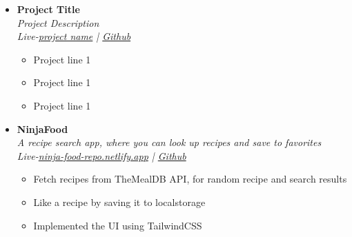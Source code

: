 \documentclass[11pt, oneside, a4paper, titlepage]{article}
\begin{document}
\begin{tcolorbox}
\begin{minipage}[t]{11cm}
\begin{tcolorbox}[grow to right by=0.75cm,colframe=white,colback=white]
\begin{itemize}
        \item
        {
          \textbf{Project Title} \\
          \textit{Project Description} \\
          \textit{Live-\href{url}{project name} | \href{https://github.com/SazedWorldbringer}{Github}} \\
          \vspace*{-0.7cm}
          \begin{itemize}
            \item Project line 1
            \item Project line 1
            \item Project line 1
          \end{itemize}
        }

        \item
        {
          \textbf{NinjaFood} \\
          \textit{A recipe search app, where you can look up recipes and save to favorites} \\
          \textit{Live-\href{https://ninja-food-repo.netlify.app}{ninja-food-repo.netlify.app} | \href{https://github.com/SazedWorldbringer/ninjafood}{Github}} \\
          \vspace*{-0.7cm}
          \begin{itemize}
            \item Fetch recipes from TheMealDB API, for random recipe and search results
            \item Like a recipe by saving it to localstorage
            \item Implemented the UI using TailwindCSS
          \end{itemize}
        }


\end{itemize}
\end{tcolorbox}
\end{minipage}
\end{tcolorbox}
\end{document}
